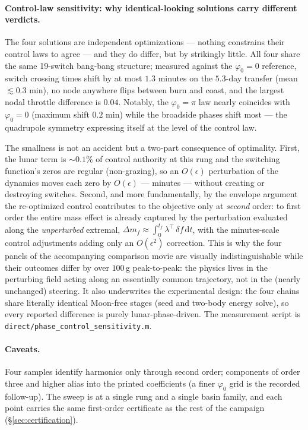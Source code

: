 \documentclass[11pt]{article}
\begin{document}
\paragraph{Control-law sensitivity: why identical-looking solutions carry
different verdicts.}
The four solutions are independent optimizations --- nothing constrains
their control laws to agree --- and they do differ, but by strikingly
little. All four share the same 19-switch bang-bang structure; measured
against the $\varphi_0 = 0$ reference, switch crossing times shift by at
most $1.3$ minutes on the $5.3$-day transfer (mean $\lesssim 0.3$ min), no
node anywhere flips between burn and coast, and the largest nodal throttle
difference is $0.04$. Notably, the $\varphi_0 = \pi$ law nearly coincides
with $\varphi_0 = 0$ (maximum shift $0.2$ min) while the broadside phases
shift most --- the quadrupole symmetry expressing itself at the level of
the control law.

The smallness is not an accident but a two-part consequence of optimality.
First, the lunar term is $\sim 0.1\%$ of control authority at this rung and
the switching function's zeros are regular (non-grazing), so an $O(\epsilon)$
perturbation of the dynamics moves each zero by $O(\epsilon)$ --- minutes ---
without creating or destroying switches. Second, and more fundamentally, by
the envelope argument the re-optimized control contributes to the objective
only at \emph{second} order: to first order the entire mass effect is
already captured by the perturbation evaluated along the \emph{unperturbed}
extremal, $\Delta m_f \approx \int_0^{t_f} \lambda^{\!\top}\,
\delta\!f\,\mathrm{d}t$, with the minutes-scale control adjustments adding
only an $O(\epsilon^2)$ correction. This is why the four panels of the
accompanying comparison movie are visually indistinguishable while their
outcomes differ by over $100$\,g peak-to-peak: the physics lives in the
perturbing field acting along an essentially common trajectory, not in the
(nearly unchanged) steering. It also underwrites the experimental design:
the four chains share literally identical Moon-free stages (seed and
two-body energy solve), so every reported difference is purely
lunar-phase-driven. The measurement script is
\texttt{direct/phase\_control\_sensitivity.m}.

\paragraph{Caveats.}
Four samples identify harmonics only through second order; components of
order three and higher alias into the printed coefficients (a finer
$\varphi_0$ grid is the recorded follow-up). The sweep is at a single rung
and a single basin family, and each point carries the same first-order
certificate as the rest of the campaign (\S\ref{sec:certification}).
\end{document}
